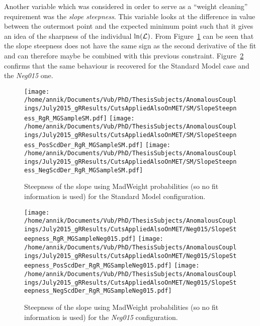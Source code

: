 Another variable which was considered in order to serve as a ``weight cleaning'' requirement was the \textit{slope steepness}. 
This variable looks at the difference in value between the outermost point and the expected minimum point such that it gives an idea of the sharpness of the individual $\ln(\mathcal{L})$. 
From Figure~\ref{fig::SlopeSteepness_gRSM} can be seen that the slope steepness does not have the same sign as the second derivative of the fit and can therefore maybe be combined with this previous constraint. Figure~\ref{fig::SlopeSteepness_gRNeg015} confirms that the same behaviour is recovered for the Standard Model case and the \textit{Neg015} one.

\begin{figure}[h!t]
 \centering
 \texttt{[image: /home/annik/Documents/Vub/PhD/ThesisSubjects/AnomalousCouplings/July2015\_gRResults/CutsAppliedAlsoOnMET/SM/SlopeSteepness\_RgR\_MGSampleSM.pdf]}
 \texttt{[image: /home/annik/Documents/Vub/PhD/ThesisSubjects/AnomalousCouplings/July2015\_gRResults/CutsAppliedAlsoOnMET/SM/SlopeSteepness\_PosScdDer\_RgR\_MGSampleSM.pdf]}
 \texttt{[image: /home/annik/Documents/Vub/PhD/ThesisSubjects/AnomalousCouplings/July2015\_gRResults/CutsAppliedAlsoOnMET/SM/SlopeSteepness\_NegScdDer\_RgR\_MGSampleSM.pdf]}
 \caption{Steepness of the slope using MadWeight probabilities (so no fit information is used) for the Standard Model configuration.} \label{fig::SlopeSteepness_gRSM}
\end{figure}

\begin{figure}[h!t]
 \centering
 \texttt{[image: /home/annik/Documents/Vub/PhD/ThesisSubjects/AnomalousCouplings/July2015\_gRResults/CutsAppliedAlsoOnMET/Neg015/SlopeSteepness\_RgR\_MGSampleNeg015.pdf]}
 \texttt{[image: /home/annik/Documents/Vub/PhD/ThesisSubjects/AnomalousCouplings/July2015\_gRResults/CutsAppliedAlsoOnMET/Neg015/SlopeSteepness\_PosScdDer\_RgR\_MGSampleNeg015.pdf]}
 \texttt{[image: /home/annik/Documents/Vub/PhD/ThesisSubjects/AnomalousCouplings/July2015\_gRResults/CutsAppliedAlsoOnMET/Neg015/SlopeSteepness\_NegScdDer\_RgR\_MGSampleNeg015.pdf]}
 \caption{Steepness of the slope using MadWeight probabilities (so no fit information is used) for the \textit{Neg015} configuration.} \label{fig::SlopeSteepness_gRNeg015}
\end{figure}

